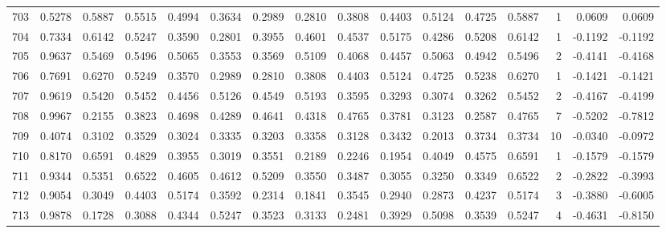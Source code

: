 \begin{tabular}{lrrrrrrrrrrrrrrr}
703 &      0.5278 &  0.5887 &  0.5515 &  0.4994 &  0.3634 &  0.2989 &  0.2810 &  0.3808 &  0.4403 &  0.5124 &   0.4725 &     0.5887 &      1 &                    0.0609 &                     0.0609 \\
704 &      0.7334 &  0.6142 &  0.5247 &  0.3590 &  0.2801 &  0.3955 &  0.4601 &  0.4537 &  0.5175 &  0.4286 &   0.5208 &     0.6142 &      1 &                   -0.1192 &                    -0.1192 \\
705 &      0.9637 &  0.5469 &  0.5496 &  0.5065 &  0.3553 &  0.3569 &  0.5109 &  0.4068 &  0.4457 &  0.5063 &   0.4942 &     0.5496 &      2 &                   -0.4141 &                    -0.4168 \\
706 &      0.7691 &  0.6270 &  0.5249 &  0.3570 &  0.2989 &  0.2810 &  0.3808 &  0.4403 &  0.5124 &  0.4725 &   0.5238 &     0.6270 &      1 &                   -0.1421 &                    -0.1421 \\
707 &      0.9619 &  0.5420 &  0.5452 &  0.4456 &  0.5126 &  0.4549 &  0.5193 &  0.3595 &  0.3293 &  0.3074 &   0.3262 &     0.5452 &      2 &                   -0.4167 &                    -0.4199 \\
708 &      0.9967 &  0.2155 &  0.3823 &  0.4698 &  0.4289 &  0.4641 &  0.4318 &  0.4765 &  0.3781 &  0.3123 &   0.2587 &     0.4765 &      7 &                   -0.5202 &                    -0.7812 \\
709 &      0.4074 &  0.3102 &  0.3529 &  0.3024 &  0.3335 &  0.3203 &  0.3358 &  0.3128 &  0.3432 &  0.2013 &   0.3734 &     0.3734 &     10 &                   -0.0340 &                    -0.0972 \\
710 &      0.8170 &  0.6591 &  0.4829 &  0.3955 &  0.3019 &  0.3551 &  0.2189 &  0.2246 &  0.1954 &  0.4049 &   0.4575 &     0.6591 &      1 &                   -0.1579 &                    -0.1579 \\
711 &      0.9344 &  0.5351 &  0.6522 &  0.4605 &  0.4612 &  0.5209 &  0.3550 &  0.3487 &  0.3055 &  0.3250 &   0.3349 &     0.6522 &      2 &                   -0.2822 &                    -0.3993 \\
712 &      0.9054 &  0.3049 &  0.4403 &  0.5174 &  0.3592 &  0.2314 &  0.1841 &  0.3545 &  0.2940 &  0.2873 &   0.4237 &     0.5174 &      3 &                   -0.3880 &                    -0.6005 \\
713 &      0.9878 &  0.1728 &  0.3088 &  0.4344 &  0.5247 &  0.3523 &  0.3133 &  0.2481 &  0.3929 &  0.5098 &   0.3539 &     0.5247 &      4 &                   -0.4631 &                    -0.8150 \\

\end{tabular}
